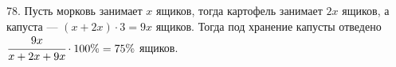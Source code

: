 78. Пусть морковь занимает $x$ ящиков, тогда картофель занимает $2x$ ящиков, а капуста --- $(x+2x)\cdot3=9x$ ящиков. Тогда под хранение капусты отведено $\cfrac{9x}{x+2x+9x}\cdot100\%=75\%$ ящиков.\\
